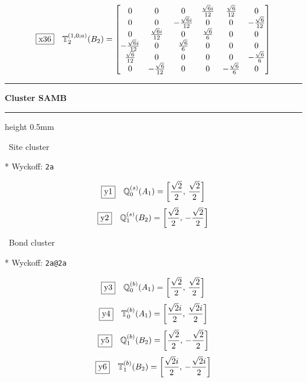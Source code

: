 \documentclass[fleqn,10pt,landscape]{jsarticle}
\begin{document}
\begin{dmath*}
\fbox{x36}\quad \mathbb{T}_{2}^{(1,0;a)}(B_{2})=\begin{bmatrix} 0 & 0 & 0 & \frac{\sqrt{6} i}{12} & \frac{\sqrt{6}}{12} & 0 \\ 0 & 0 & - \frac{\sqrt{6} i}{12} & 0 & 0 & - \frac{\sqrt{6}}{12} \\ 0 & \frac{\sqrt{6} i}{12} & 0 & \frac{\sqrt{6}}{6} & 0 & 0 \\ - \frac{\sqrt{6} i}{12} & 0 & \frac{\sqrt{6}}{6} & 0 & 0 & 0 \\ \frac{\sqrt{6}}{12} & 0 & 0 & 0 & 0 & - \frac{\sqrt{6}}{6} \\ 0 & - \frac{\sqrt{6}}{12} & 0 & 0 & - \frac{\sqrt{6}}{6} & 0 \end{bmatrix}
\end{dmath*}
\vspace{5mm}
\noindent \rule[0.5mm]{5mm}{0.5mm}\hspace{3mm}\textbf{Cluster SAMB}\hspace{3mm}\leaders\hrule height 0.5mm\hfill\kern0pt
\vspace{3mm}

\noindent\textbullet\, Site cluster

\vspace{5mm}

\noindent ** Wyckoff: \texttt{2a}

\begin{dmath*}
\fbox{y1}\quad \mathbb{Q}_{0}^{(s)}(A_{1})=\left[ \frac{\sqrt{2}}{2},\, \frac{\sqrt{2}}{2} \right]
\end{dmath*}
\begin{dmath*}
\fbox{y2}\quad \mathbb{Q}_{1}^{(s)}(B_{2})=\left[ \frac{\sqrt{2}}{2},\, - \frac{\sqrt{2}}{2} \right]
\end{dmath*}
\vspace{5mm}

\noindent\textbullet\, Bond cluster

\vspace{5mm}

\noindent ** Wyckoff: \texttt{2a@2a}

\begin{dmath*}
\fbox{y3}\quad \mathbb{Q}_{0}^{(b)}(A_{1})=\left[ \frac{\sqrt{2}}{2},\, \frac{\sqrt{2}}{2} \right]
\end{dmath*}
\begin{dmath*}
\fbox{y4}\quad \mathbb{T}_{0}^{(b)}(A_{1})=\left[ \frac{\sqrt{2} i}{2},\, \frac{\sqrt{2} i}{2} \right]
\end{dmath*}
\begin{dmath*}
\fbox{y5}\quad \mathbb{Q}_{1}^{(b)}(B_{2})=\left[ \frac{\sqrt{2}}{2},\, - \frac{\sqrt{2}}{2} \right]
\end{dmath*}
\begin{dmath*}
\fbox{y6}\quad \mathbb{T}_{1}^{(b)}(B_{2})=\left[ \frac{\sqrt{2} i}{2},\, - \frac{\sqrt{2} i}{2} \right]
\end{dmath*}
\vspace{5mm}
\end{document}
